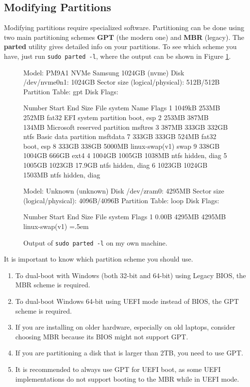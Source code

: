\documentclass{article}
\newenvironment{cverbatim}
    {\SaveVerbatim{cverb}}
    {\endSaveVerbatim
    \flushleft\fboxrule=0pt\fboxsep=.5em
    \colorbox{cverbbg}{%
      \makebox[\dimexpr\linewidth-2\fboxsep][l]{\BUseVerbatim{cverb}}%
    }
    \endflushleft
  }
\begin{document}
  \subsection{Modifying Partitions} 
    
    Modifying partitions require specialized software. Partitioning can be done using two main partitioning schemes \textbf{GPT} (the modern one) and \textbf{MBR} (legacy). The \textbf{parted} utility gives detailed info on your partitions. To see which scheme you have, just run \texttt{sudo parted -l}, where the output can be shown in Figure \ref{fig:parted}. 

    \begin{figure}[hbt!]
      \centering 
      \begin{cverbatim} 
Model: PM9A1 NVMe Samsung 1024GB (nvme)
Disk /dev/nvme0n1: 1024GB
Sector size (logical/physical): 512B/512B
Partition Table: gpt
Disk Flags: 

Number  Start   End     Size    File system     Name                          Flags
 1      1049kB  253MB   252MB   fat32           EFI system partition          boot, esp
 2      253MB   387MB   134MB                   Microsoft reserved partition  msftres
 3      387MB   333GB   332GB   ntfs            Basic data partition          msftdata
 7      333GB   333GB   524MB   fat32                                         boot, esp
 8      333GB   338GB   5000MB  linux-swap(v1)                                swap
 9      338GB   1004GB  666GB   ext4
 4      1004GB  1005GB  1038MB  ntfs                                          hidden, diag
 5      1005GB  1023GB  17.9GB  ntfs                                          hidden, diag
 6      1023GB  1024GB  1503MB  ntfs                                          hidden, diag


Model: Unknown (unknown)
Disk /dev/zram0: 4295MB
Sector size (logical/physical): 4096B/4096B
Partition Table: loop
Disk Flags: 

Number  Start  End     Size    File system     Flags
 1      0.00B  4295MB  4295MB  linux-swap(v1) 
      \end{cverbatim}
      \caption{Output of \texttt{sudo parted -l} on my own machine. } 
      \label{fig:parted}
    \end{figure}

    It is important to know which partition scheme you should use. 
    \begin{enumerate} 
      \item To dual-boot with Windows (both 32-bit and 64-bit) using Legacy BIOS, the MBR scheme is required.
      \item To dual-boot Windows 64-bit using UEFI mode instead of BIOS, the GPT scheme is required.
      \item If you are installing on older hardware, especially on old laptops, consider choosing MBR because its BIOS might not support GPT.
      \item If you are partitioning a disk that is larger than 2TB, you need to use GPT.
      \item It is recommended to always use GPT for UEFI boot, as some UEFI implementations do not support booting to the MBR while in UEFI mode.
    \end{enumerate}
\end{document}
